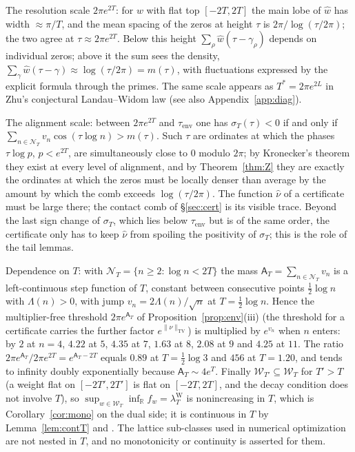 \documentclass[11pt]{amsart}
\theoremstyle{definition}
\theoremstyle{remark}
\newcommand{\R}{\mathbb R}
\newcommand{\TV}{\operatorname{TV}}
\newcommand{\lamW}{\lambda^{\mathrm W}_T}
\newcommand{\sT}{\sigma_T}
\newcommand{\nuh}{\widehat\nu}
\newcommand{\wh}{\widehat w}
\newcommand{\Wcl}{\mathcal W_T}
\newcommand{\NT}{\mathcal N_T}
\newcommand{\Aconst}{\mathsf A_T}
\begin{document}
The resolution scale $2\pi e^{2T}$: for $w$ with flat top $[-2T,2T]$ the main lobe of $\wh$ has width
$\approx\pi/T$, and the mean spacing of the zeros at height $\tau$ is $2\pi/\log(\tau/2\pi)$; the two
agree at $\tau\approx2\pi e^{2T}$. Below this height $\sum_\rho\wh(\tau-\gamma_\rho)$ depends on individual
zeros; above it the sum sees the density, $\sum_\gamma\wh(\tau-\gamma)\approx\log(\tau/2\pi)=m(\tau)$, with
fluctuations expressed by the explicit formula through the primes. The same scale appears as
$T^*=2\pi e^{2L}$ in Zhu's conjectural Landau--Widom law \cite[Conj.~12.1]{Zhu2026}
(see also Appendix~\ref{app:diag}).

The alignment scale: between $2\pi e^{2T}$ and $\tau_{\mathrm{env}}$ one has $\sT(\tau)<0$ if and only if
$\sum_{n\in\NT}v_n\cos(\tau\log n)>m(\tau)$. Such $\tau$ are ordinates at which the phases $\tau\log p$,
$p<e^{2T}$, are simultaneously close to $0$ modulo $2\pi$; by Kronecker's theorem they exist at every
level of alignment, and by Theorem~\ref{thm:Z} they are exactly the ordinates at which the zeros must be
locally denser than average by the amount by which the comb exceeds $\log(\tau/2\pi)$. The function
$\nuh$ of a certificate must be large there; the contact comb of \S\ref{sec:cert} is its visible trace.
Beyond the last sign change of $\sT$, which lies below $\tau_{\mathrm{env}}$ but is of the same order,
the certificate only has to keep $\nuh$ from spoiling the positivity of $\sT$; this is the role of the
tail lemmas.

Dependence on $T$: with $\NT=\{n\ge2:\log n<2T\}$ the mass $\Aconst=\sum_{n\in\NT}v_n$ is a
left-continuous step function of $T$, constant between consecutive points $\frac12\log n$ with
$\Lambda(n)>0$, with jump $v_n=2\Lambda(n)/\sqrt n$ at $T=\frac12\log n$. Hence the multiplier-free
threshold $2\pi e^{\Aconst}$ of Proposition~\ref{prop:env}(iii) (the threshold for a certificate carries
the further factor $e^{\|\nu\|_{\TV}}$) is multiplied by $e^{v_n}$ when $n$ enters: by $2$ at $n=4$, $4.22$
at $5$, $4.35$ at $7$, $1.63$ at $8$, $2.08$ at $9$ and $4.25$ at $11$. The ratio
$2\pi e^{\Aconst}/2\pi e^{2T}=e^{\Aconst-2T}$ equals $0.89$ at $T=\frac12\log3$ and $456$ at $T=1.20$, and
tends to infinity doubly exponentially because $\Aconst\sim4e^T$. Finally $\mathcal W_{T'}\subseteq\Wcl$
for $T'>T$ (a weight flat on $[-2T',2T']$ is flat on $[-2T,2T]$, and the decay condition does not
involve $T$), so $\sup_{w\in\Wcl}\inf_\R f_w=\lamW$ is nonincreasing in $T$, which is
Corollary~\ref{cor:mono} on the dual side; it is continuous in $T$ by Lemma~\ref{lem:contT} and
\cite[Thm.~5]{Bombieri2000}. The lattice sub-classes used in numerical optimization are not nested in
$T$, and no monotonicity or continuity is asserted for them.
\end{document}
